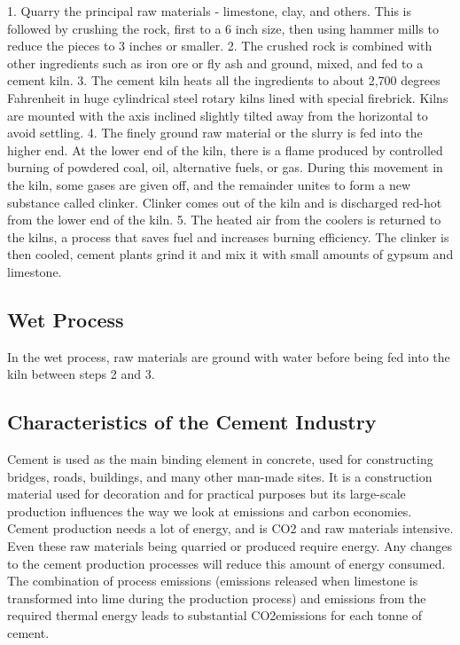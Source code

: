 1.	Quarry the principal raw materials - limestone, clay, and others. This is followed by crushing the rock, first to a 6 inch size, then using hammer mills to reduce the pieces to 3 inches or smaller.
2.	The crushed rock is combined with other ingredients such as iron ore or fly ash and ground, mixed, and fed to a cement kiln.
3.	The cement kiln heats all the ingredients to about 2,700 degrees Fahrenheit in huge cylindrical steel rotary kilns lined with special firebrick. Kilns are mounted with the axis inclined slightly tilted away from the horizontal to avoid settling.
4.	The finely ground raw material or the slurry is fed into the higher end. At the lower end of the kiln, there is a flame produced by controlled burning of powdered coal, oil, alternative fuels, or gas. During this movement in the kiln, some gases are given off, and the remainder unites to form a new substance called clinker. Clinker comes out of the kiln and is discharged red-hot from the lower end of the kiln.
5.	The heated air from the coolers is returned to the kilns, a process that saves fuel and increases burning efficiency. The clinker is then cooled, cement plants grind it and mix it with small amounts of gypsum and limestone. 

\subsection{Wet Process}

In the wet process, raw materials are ground with water before being fed into the kiln between steps 2 and 3.

\subsection{Characteristics of the Cement Industry}

Cement is used as the main binding element in concrete, used for constructing bridges, roads, buildings, and many other man-made sites. It is a construction material used for decoration and for practical purposes but its large-scale production influences the way we look at emissions and carbon economies.
Cement production needs a lot of energy, and is CO2 and raw materials intensive. Even these raw materials being quarried or produced require energy. Any changes to the cement production processes will reduce this amount of energy consumed. The combination of process emissions (emissions released when limestone is transformed into lime during the production process) and emissions from the required thermal energy leads to substantial CO2emissions for each tonne of cement. 

